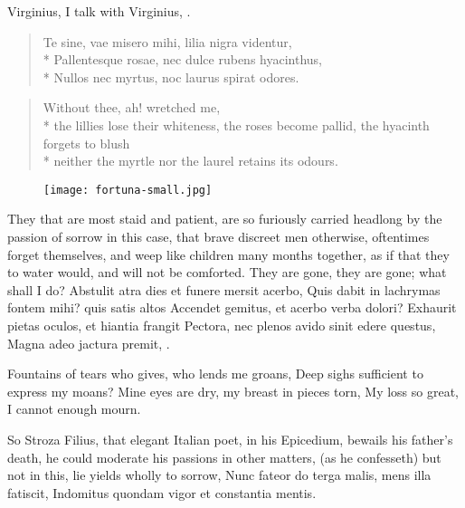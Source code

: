 {Virginius, I talk with Virginius, \etc{}.
%
\begin{latin}
\begin{verse}
Te sine, vae misero mihi, lilia nigra videntur,\\*
Pallentesque rosae, nec dulce rubens hyacinthus,\\*
Nullos nec myrtus, noc laurus spirat odores.
\end{verse}
\end{latin}
\translationrule
\begin{verse}%
Without thee, ah! wretched me,\\*
the lillies lose their whiteness, the roses become pallid, the hyacinth forgets to blush\\*
neither the myrtle nor the laurel retains its odours.
\end{verse}

\cleartoleftpage{}
\begin{figure}[p]
  \begingroup
  \centering
  \texttt{[image: fortuna-small.jpg]}
  \label{fig:fortuna}
\end{figure}

\clearpage{}
They that are most staid and patient, are so furiously carried headlong
by the passion of sorrow in this case, that brave discreet men
otherwise, oftentimes forget themselves, and weep like children many
months together, as if that they to water would, and will not be
comforted. They are gone, they are gone; what shall I do?
Abstulit atra dies et funere mersit acerbo,
Quis dabit in lachrymas fontem mihi? quis satis altos
Accendet gemitus, et acerbo verba dolori?
Exhaurit pietas oculos, et hiantia frangit
Pectora, nec plenos avido sinit edere questus,
Magna adeo jactura premit, \etc{}.

Fountains of tears who gives, who lends me groans,
Deep sighs sufficient to express my moans?
Mine eyes are dry, my breast in pieces torn,
My loss so great, I cannot enough mourn.

So Stroza Filius, that elegant Italian poet, in his Epicedium, bewails
his father's death, he could moderate his passions in other matters,
(as he confesseth) but not in this, lie yields wholly to sorrow,
Nunc fateor do terga malis, mens illa fatiscit,
Indomitus quondam vigor et constantia mentis.

}
